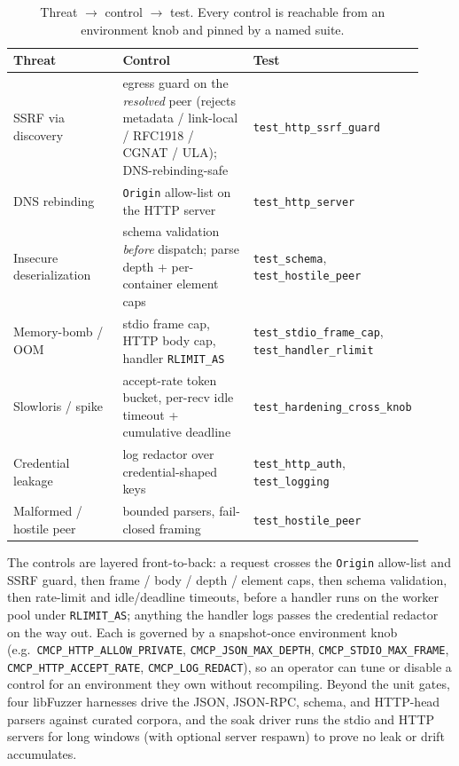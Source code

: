 \documentclass[10pt]{article}
\newcommand{\code}[1]{\texttt{\small #1}}
\begin{document}
\begin{table}[ht]
  \centering
  \caption{Threat $\rightarrow$ control $\rightarrow$ test. Every control is
  reachable from an environment knob and pinned by a named suite.}
  \begin{tabular}{p{0.30\linewidth} p{0.42\linewidth} p{0.20\linewidth}}
    \toprule
    Threat & Control & Test \\
    \midrule
    SSRF via discovery & egress guard on the \emph{resolved} peer (rejects
      metadata / link-local / RFC1918 / CGNAT / ULA); DNS-rebinding-safe
      & \code{test\_http\_ssrf\_guard} \\
    DNS rebinding & \code{Origin} allow-list on the HTTP server
      & \code{test\_http\_server} \\
    Insecure deserialization & schema validation \emph{before} dispatch; parse
      depth + per-container element caps
      & \code{test\_schema}, \code{test\_hostile\_peer} \\
    Memory-bomb / OOM & stdio frame cap, HTTP body cap, handler \code{RLIMIT\_AS}
      & \code{test\_stdio\_frame\_cap}, \code{test\_handler\_rlimit} \\
    Slowloris / spike & accept-rate token bucket, per-recv idle timeout +
      cumulative deadline
      & \code{test\_hardening\_cross\_knob} \\
    Credential leakage & log redactor over credential-shaped keys
      & \code{test\_http\_auth}, \code{test\_logging} \\
    Malformed / hostile peer & bounded parsers, fail-closed framing
      & \code{test\_hostile\_peer} \\
    \bottomrule
  \end{tabular}
\end{table}

The controls are layered front-to-back: a request crosses the \code{Origin}
allow-list and SSRF guard, then frame / body / depth / element caps, then
schema validation, then rate-limit and idle/deadline timeouts, before a handler
runs on the worker pool under \code{RLIMIT\_AS}; anything the handler logs
passes the credential redactor on the way out. Each is governed by a snapshot-once
environment knob (e.g.\ \code{CMCP\_HTTP\_ALLOW\_PRIVATE},
\code{CMCP\_JSON\_MAX\_DEPTH}, \code{CMCP\_STDIO\_MAX\_FRAME},
\code{CMCP\_HTTP\_ACCEPT\_RATE}, \code{CMCP\_LOG\_REDACT}), so an operator can
tune or disable a control for an environment they own without recompiling.
Beyond the unit gates, four libFuzzer harnesses drive the JSON, JSON-RPC,
schema, and HTTP-head parsers against curated corpora, and the soak driver runs
the stdio and HTTP servers for long windows (with optional server respawn) to
prove no leak or drift accumulates.
\end{document}

